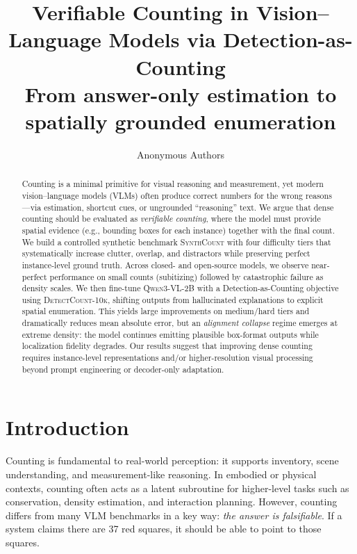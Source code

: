 \documentclass[10pt]{article}
\title{\vspace{-1.2em}
\textbf{Verifiable Counting in Vision--Language Models via Detection-as-Counting}\\
\vspace{-0.4em}\large From answer-only estimation to spatially grounded enumeration
\vspace{-0.8em}}
\author{Anonymous Authors}
\date{}
\newcommand{\dataset}{\textsc{SynthCount}\xspace}         %
\newcommand{\trainset}{\textsc{DetectCount-10k}\xspace}   %
\newcommand{\qwenbase}{\textsc{Qwen3-VL-2B}\xspace}
\begin{document}
\maketitle

\begin{abstract}
Counting is a minimal primitive for visual reasoning and measurement, yet modern vision--language models (VLMs) often produce correct numbers for the wrong reasons---via estimation, shortcut cues, or ungrounded ``reasoning'' text.
We argue that dense counting should be evaluated as \emph{verifiable counting}, where the model must provide spatial evidence (e.g., bounding boxes for each instance) together with the final count.
We build a controlled synthetic benchmark \dataset with four difficulty tiers that systematically increase clutter, overlap, and distractors while preserving perfect instance-level ground truth.
Across closed- and open-source models, we observe near-perfect performance on small counts (subitizing) followed by catastrophic failure as density scales.
We then fine-tune \qwenbase with a Detection-as-Counting objective using \trainset, shifting outputs from hallucinated explanations to explicit spatial enumeration.
This yields large improvements on medium/hard tiers and dramatically reduces mean absolute error, but an \emph{alignment collapse} regime emerges at extreme density: the model continues emitting plausible box-format outputs while localization fidelity degrades.
Our results suggest that improving dense counting requires instance-level representations and/or higher-resolution visual processing beyond prompt engineering or decoder-only adaptation.
\end{abstract}

\section{Introduction}
Counting is fundamental to real-world perception: it supports inventory, scene understanding, and measurement-like reasoning.
In embodied or physical contexts, counting often acts as a latent subroutine for higher-level tasks such as conservation, density estimation, and interaction planning.
However, counting differs from many VLM benchmarks in a key way: \emph{the answer is falsifiable}.
If a system claims there are 37 red squares, it should be able to point to those squares.
\end{document}
